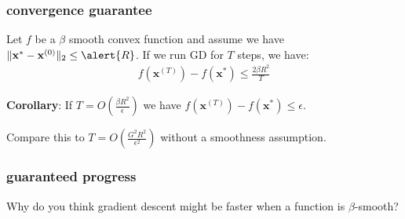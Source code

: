 \documentclass[compress]{beamer}
\newcommand{\bv}[1]{\mathbf{#1}}
\begin{document}

\begin{frame}[t]
	\frametitle{convergence guarantee}
	\begin{theorem}
		Let $f$ be a \alert{$\beta$} smooth convex function and assume we have $\|\bv{x}^{*} - \bv{x}^{(0)}\|_2 \leq \alert{R}$. If we run GD for $T$ steps, we have:
		\begin{align*}
			f(\bv{x}^{(T)}) - f(\bv{x}^*) \leq \frac{2\beta R^2}{T} 
		\end{align*} 
	\end{theorem}
	\textbf{Corollary}: If \alert{$T = O\left(\frac{\beta R^2}{\epsilon}\right)$} we have $f(\bv{x}^{(T)}) - f(\bv{x}^*) \leq \epsilon$.
	
	\vspace{1em}
		Compare this to $T = O\left(\frac{G^2 R^2}{\epsilon^2}\right)$ without  a smoothness assumption.
\end{frame}

\begin{frame}[t]
	\frametitle{guaranteed progress}
	\begin{center}
	Why do you think gradient descent might be faster when a function is $\beta$-smooth?
	\end{center}
\end{frame}
\end{document}
